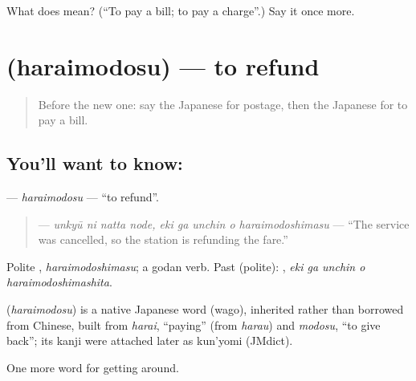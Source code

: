 \begin{tcolorbox}[breakable,colback=teal!4,colframe=teal!35!black,title={Before you move on}]
What does  mean? (\textquotedblleft{}To pay a bill; to pay a charge\textquotedblright{}.) Say it once more.
\end{tcolorbox}
\section[\texorpdfstring{\ja{はらいもどす} (haraimodosu)}{はらいもどす (haraimodosu)}]{ (haraimodosu) — to refund}

\label{lesson:JA-C420-haraimodosu}



\begin{quote}
Before the new one: say the Japanese for postage, then the Japanese for to pay a bill.
\end{quote}

\subsection*{You'll want to know: }
\textbf{} — \emph{haraimodosu} — \textquotedblleft{}to refund\textquotedblright{}.

\begin{quote}
\textbf{   } — \emph{unkyū ni natta node, eki ga unchin o haraimodoshimasu} — \textquotedblleft{}The service was cancelled, so the station is refunding the fare.\textquotedblright{}
\end{quote}

Polite \textbf{}, \emph{haraimodoshimasu}; a godan verb. Past (polite): \textbf{  }, \emph{eki ga unchin o haraimodoshimashita}.

\begin{cousinweb}
\textbf{} (\emph{haraimodosu}) is a native Japanese word (wago), inherited rather than borrowed from Chinese, built from \emph{harai}, \textquotedblleft{}paying\textquotedblright{} (from \emph{harau}) and \emph{modosu}, \textquotedblleft{}to give back\textquotedblright{}; its kanji were attached later as kun'yomi (JMdict).
\end{cousinweb}

\begin{grammarlens}[title={What you've built}]
One more word for getting around.
\end{grammarlens}

